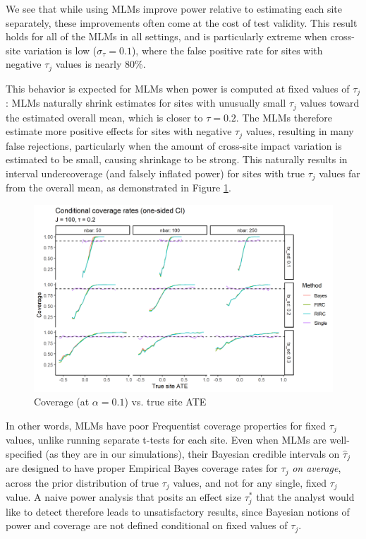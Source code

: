 \documentclass[]{article}
\begin{document}
We see that while using MLMs improve power relative to estimating each site separately, these improvements often come at the cost of test validity.
This result holds for all of the MLMs in all settings, and is particularly extreme when cross-site variation is low ($\sigma_\tau = 0.1$), where the false positive rate for sites with negative $\tau_j$ values is nearly 80\%.

This behavior is expected for MLMs when power is computed at fixed values of $\tau_j$: MLMs naturally shrink estimates for sites with unusually small $\tau_j$ values toward the estimated overall mean, which is closer to $\tau = 0.2$.
The MLMs therefore estimate more positive effects for sites with negative $\tau_j$ values, resulting in many false rejections, particularly when the amount of cross-site impact variation is estimated to be small, causing shrinkage to be strong.
This naturally results in interval undercoverage (and falsely inflated power) for sites with true $\tau_j$ values far from the overall mean, as demonstrated in Figure \ref{fig:coverage_plot}.
\begin{figure}[ht]
	\centering
	\includegraphics[width=\textwidth]{writeup/images/coverage_plot.png}
	\caption{Coverage (at $\alpha = 0.1$) vs. true site ATE}
	\label{fig:coverage_plot}
\end{figure}

In other words, MLMs have poor Frequentist coverage properties for fixed $\tau_j$ values, unlike running separate t-tests for each site.
Even when MLMs are well-specified (as they are in our simulations), their Bayesian credible intervals on $\hat{\tau}_j$ are designed to have proper Empirical Bayes coverage rates for $\tau_j$ \textit{on average}, across the prior distribution of true $\tau_j$ values, and not for any single, fixed $\tau_j$ value.
A naive power analysis that posits an effect size $\tau_j^*$ that the analyst would like to detect therefore leads to unsatisfactory results, since Bayesian notions of power and coverage are not defined conditional on fixed values of $\tau_j$.
\end{document}
